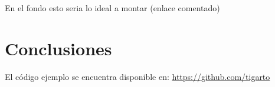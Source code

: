 \documentclass[12pt]{article}
\begin{document}
En el fondo esto seria lo ideal a montar (enlace comentado)

\section{Conclusiones}




El código ejemplo se encuentra disponible en: \url{https://github.com/tigarto}



\end{document}
